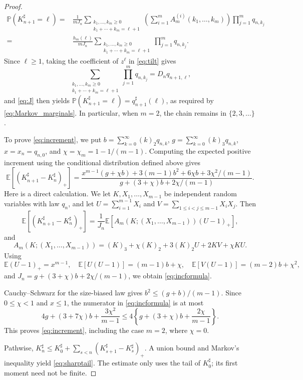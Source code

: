 \documentclass[11pt,letterpaper,reqno]{amsart}
\numberwithin{equation}{section}
\theoremstyle{plain}
\theoremstyle{remark}
\newcommand{\E}{\mathbb E}\newcommand{\Pp}{\mathbb P}
\begin{document}
\begin{proof}
\begin{equation*}
\begin{split}
    \Pp(K^{\sharp}_{n + 1} = \ell) = {}& \frac{1}{mJ_n} \sum_{\substack{k_1, \dotsc, k_m \geq 0 \\ k_1 + \dotsb + k_m = \ell + 1}} \left( \sum^m_{i = 1} A^{(i)}_m(k_1, \dotsc, k_m) \right) \prod^m_{j = 1} q_{n, k_j} \\
    = {}& \frac{h_m(\ell)}{mJ_n} \sum_{\substack{k_1, \dotsc, k_m \geq 0 \\ k_1 + \dotsb + k_m = \ell + 1}} \prod^m_{j = 1} q_{n, k_j}.
\end{split} 
\end{equation*}
Since $\ell\ge1$, taking the coefficient of $z^\ell$ in \eqref{eq:tilt} gives
\begin{equation*}
    \sum_{\substack{k_1, \dotsc, k_m \geq 0 \\ k_1 + \dotsb + k_m = \ell + 1}} \prod^m_{j = 1} q_{n, k_j} = D_n q_{n + 1, \ell},
\end{equation*}
and \eqref{eq:J} then yields $\Pp(K^{\sharp}_{n + 1} = \ell) = q^{\sharp}_{n + 1}(\ell)$, as required by \eqref{eq:Markov_marginals}. In particular, when $m=2$, the chain remains in $\{2,3,\ldots\}$.

To prove \eqref{eq:increment}, we put $b= \sum^{\infty}_{k = 0} (k)_2 q_{n, k}$, $g= \sum^{\infty}_{k = 0} (k)_3 q_{n, k}$, $x=x_n = q_{n, 0}$, and $\chi=\chi_m = 1 - 1/(m - 1)$. Computing the expected positive increment using the conditional distribution defined above gives
\begin{equation}\label{eq:incformula}
 \E[(K_{n+1}^\sharp-K_n^\sharp)_+]
 =\frac{x^{m-1}(g+\chi b)+3(m-1)b^2+6\chi b+3\chi^2/(m-1)}
 {g+(3+\chi)b+2\chi/(m-1)}.
\end{equation}
Here is a direct calculation. We let $K, X_1, \dotsc, X_{m - 1}$ be independent random variables with law $q_n$, and let $U=\sum^{m - 1}_{i = 1} X_i$ and $V=\sum_{1 \leq i<j \leq m - 1}X_iX_j$. Then
\begin{equation*}
  \E[(K_{n+1}^\sharp-K_n^\sharp)_+] = \frac{1}{J_n} \E[A_m(K; (X_1, \dotsc, X_{m - 1})) (U - 1)_+],
\end{equation*}
and 
\begin{equation*}
    A_m(K; (X_1, \dotsc, X_{m - 1})) = (K)_3 + \chi(K)_2 + 3(K)_2 U + 2KV + \chi KU.
\end{equation*}
Using
\[
 \E(U-1)_+=x^{m-1},\quad \E[U(U-1)]=(m-1)b+\chi, \quad  \E[V(U-1)]=(m-2)b+\chi^2,
\]
and $J_n = g+(3+\chi)b+2\chi/(m-1)$, we obtain \eqref{eq:incformula}.

Cauchy--Schwarz for the size-biased law gives
$b^2\le(g+b)/(m-1)$. Since $0\le\chi<1$ and $x\le1$, the numerator in \eqref{eq:incformula} is at most
\[
 4g+(3+7\chi)b+\frac{3\chi^2}{m-1}
 \le4\left\{g+(3+\chi)b+\frac{2\chi}{m-1}\right\}.
\]
This proves \eqref{eq:increment}, including the case $m=2$, where $\chi=0$.

Pathwise, $K_n^\sharp\le K_0^\sharp+\sum_{s<n}(K_{s+1}^\sharp-K_s^\sharp)_+$. A union bound and Markov's inequality yield \eqref{eq:sharptail}. The estimate only uses the tail of $K_0^\sharp$; its first moment need not be finite.
\end{proof}
\end{document}
